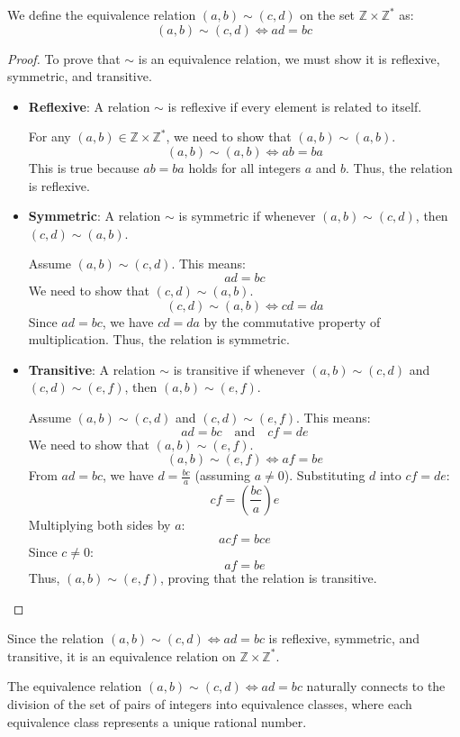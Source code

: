 We define the equivalence relation \((a, b) \sim (c, d)\) on the set \(\mathbb{Z} \times \mathbb{Z}^*\) as:
\[
(a, b) \sim (c, d) \iff ad = bc
\]
\begin{proof}
To prove that \(\sim\) is an equivalence relation, we must show it is reflexive, symmetric, and transitive.
\begin{itemize}
	\item \textbf{Reflexive}: A relation \(\sim\) is reflexive if every element is related to itself.
	
	For any \((a, b) \in \mathbb{Z} \times \mathbb{Z}^*\), we need to show that \((a, b) \sim (a, b)\).
	\[
	(a, b) \sim (a, b) \iff ab = ba
	\]
	This is true because \(ab = ba\) holds for all integers \(a\) and \(b\).
	Thus, the relation is reflexive.
	\item \textbf{Symmetric}: A relation \(\sim\) is symmetric if whenever \((a, b) \sim (c, d)\), then \((c, d) \sim (a, b)\).
	
	Assume \((a, b) \sim (c, d)\). This means:
	\[
	ad = bc
	\]
	We need to show that \((c, d) \sim (a, b)\).
	\[
	(c, d) \sim (a, b) \iff cd = da
	\]
	Since \(ad = bc\), we have \(cd = da\) by the commutative property of multiplication.
	Thus, the relation is symmetric.
	\item \textbf{Transitive}: A relation \(\sim\) is transitive if whenever \((a, b) \sim (c, d)\) and \((c, d) \sim (e, f)\), then \((a, b) \sim (e, f)\).
	
	Assume \((a, b) \sim (c, d)\) and \((c, d) \sim (e, f)\). This means:
	\[
	ad = bc \quad \text{and} \quad cf = de
	\]
	We need to show that \((a, b) \sim (e, f)\).
	\[
	(a, b) \sim (e, f) \iff af = be
	\]
	From \(ad = bc\), we have \(d = \frac{bc}{a}\) (assuming \(a \neq 0\)). Substituting \(d\) into \(cf = de\):
	\[
	c f = \left(\frac{bc}{a}\right) e
	\]
	Multiplying both sides by \(a\):
	\[
	a c f = b c e
	\]
	Since \(c \neq 0\):
	\[
	a f = b e
	\]
	Thus, \((a, b) \sim (e, f)\), proving that the relation is transitive.	
\end{itemize}
\end{proof}

Since the relation \((a, b) \sim (c, d) \iff ad = bc\) is reflexive, symmetric, and transitive, it is an equivalence relation on \(\mathbb{Z} \times \mathbb{Z}^*\).


The equivalence relation \((a, b) \sim (c, d) \iff ad = bc\) naturally connects to the division of the set of pairs of integers into equivalence classes, where each equivalence class represents a unique rational number.

